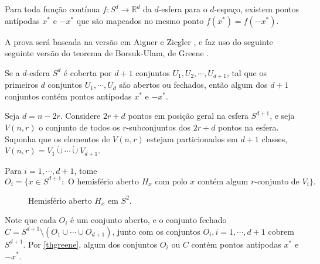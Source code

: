 \begin{teorema}\label{thborsukulam}
Para toda função contínua $f: S^d \rightarrow\mathbb{R}^d$ da $d$-esfera para o $d$-espaço, existem pontos antípodas $x^*$ e $-x^*$ que são mapeados no mesmo ponto $f(x^*) = f(-x^*)$.
\end{teorema}

A prova será baseada na versão em Aigner e Ziegler \cite{aigner2010proofs}, e faz uso do seguinte seguinte versão do teorema de Borsuk-Ulam, de Greene \cite{greene2002new}.

\begin{teorema}\label{thgreene}
Se a $d$-esfera $S^d$ é coberta por $d+1$ conjuntos $U_1, U_2, \cdots, U_{d+1}$, tal que os primeiros $d$ conjuntos $U_1,\cdots,U_d$ são abertos ou fechados, então algum dos $d+1$ conjuntos contém pontos antípodas $x^*$ e $-x^*$.
\end{teorema}

Seja $d = n - 2r$. Considere $2r+d$ pontos em posição geral na esfera $S^{d+1}$, e seja $V(n,r)$ o conjunto de todos os $r$-subconjuntos dos $2r+d$ pontos na esfera. Suponha que os elementos de $V(n,r)$ estejam particionados em $d+1$ classes, $V(n,r) = V_1 \dot\cup \cdots \dot\cup V_{d+1}$.

Para $i=1,\cdots,d+1$, tome \[O_i = \{x\in S^{d+1} : \text{ O hemisfério aberto } H_x \text{ com polo } x \text{ contém algum } r\text{-conjunto de } V_i\}.\]

\begin{figure}[H]
\centering
{}
\caption{Hemisfério aberto $H_x$ em $S^2$.}
\label{fig:kneserhemisphere}
\end{figure}

Note que cada $O_i$ é um conjunto aberto, e o conjunto fechado $C = S^{d+1}\setminus (O_1\cup \cdots \cup O_{d+1})$, junto com os conjuntos $O_i, i=1,\cdots,d+1$ cobrem $S^{d+1}$. Por \ref{thgreene}, algum dos conjuntos $O_i$ ou $C$ contém pontos antípodas $x^*$ e $-x^*$.

